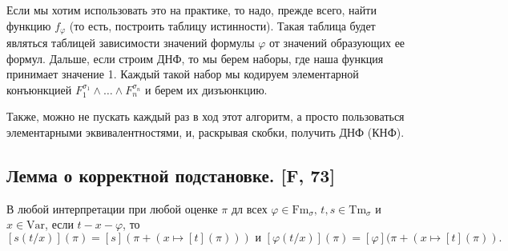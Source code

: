\documentclass[a4paper, fleqn]{article}
\begin{document}
    Если мы хотим использовать это на практике, то надо, прежде всего, найти функцию 
    $f_{\varphi}$ (то есть, построить таблицу истинности).
    Такая таблица будет являться таблицей зависимости значений формулы $\varphi$ от значений 
    образующих ее формул.
    Дальше, если строим ДНФ, то мы берем наборы, где наша функция принимает значение 1.
    Каждый такой набор мы кодируем элементарной конъюнкцией $F_{1}^{\sigma_{1}} \land \ldots 
    \land F_{n}^{\sigma_{n}}$ и берем их дизъюнкцию.
    
    Также, можно не пускать каждый раз в ход этот алгоритм, а просто пользоваться 
    элементарными эквивалентностями, и, раскрывая скобки, получить ДНФ (КНФ).

    \subsection{Лемма о корректной подстановке. [F, 73]}
    \begin{lemma} В любой интерпретации при любой оценке $\pi$ дл всех $\varphi \in \text{Fm}_{\sigma}, \, t, s \in \text{Tm}_{\sigma}$ и $x \in \text{Var}$, если $t-x-\varphi$, то
    \[ [s(t/x)](\pi) = [s](\pi + (x \mapsto [t](\pi))) \text{ и } [\varphi(t/x)](\pi) = [\varphi](\pi + (x \mapsto [t](\pi)). \]
    \end{lemma}
    
\end{document}
